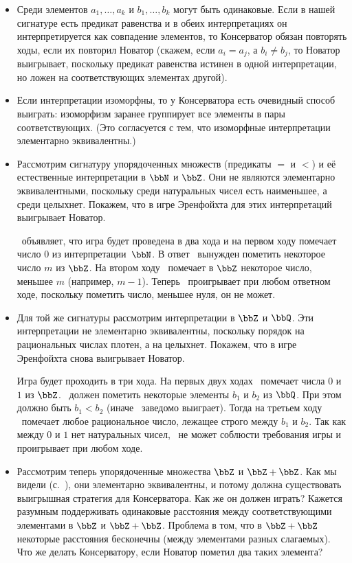 \begin{itemize}
        \item
Среди элементов $a_1,\dots,a_k$ и $b_1,\dots,b_k$ могут быть
одинаковые. Если в нашей сигнатуре есть предикат равенства и в
обеих интерпретациях он интерпретируется как совпадение
элементов, то Консерватор обязан повторять ходы, если их
повторил Новатор (скажем, если $a_i=a_j$, а $b_i\ne b_j$, то
Новатор выигрывает, поскольку предикат равенства истинен в одной
интерпретации, но ложен на соответствующих элементах другой).
        \item
Если интерпретации изоморфны, то у Консерватора есть очевидный
способ выиграть: изоморфизм заранее группирует все элементы в
пары соответствующих. (Это согласуется с тем, что изоморфные
интерпретации элементарно эквивалентны.)
        \item
Рассмотрим сигнатуру упорядоченных множеств (предикаты $=$ и
$<$) и её естественные интерпретации в $\bbN$ и $\bbZ$. Они не
являются элементарно эквивалентными, поскольку среди натуральных
чисел есть наименьшее, а среди целых\т нет. Покажем, что в игре
Эренфойхта для этих интерпретаций выигрывает Новатор.

\Н\ объявляет, что игра будет проведена в два хода и на первом
ходу помечает число $0$ из интерпретации~$\bbN$. В ответ
\К\ вынужден
пометить некоторое число $m$ из $\bbZ$. На втором ходу \Н\
помечает в $\bbZ$ некоторое число, меньшее $m$ (например,
$m-1$). Теперь \К\ проигрывает при любом ответном ходе,
поскольку пометить число, меньшее нуля, он не может.
        \item
Для той же сигнатуры рассмотрим интерпретации в $\bbZ$ и $\bbQ$.
Эти интерпретации не элементарно эквивалентны, поскольку порядок
на рациональных числах плотен, а на целых\т нет. Покажем, что в
игре Эренфойхта снова выигрывает Новатор.

Игра будет проходить в три хода. На первых двух ходах \Н\
помечает числа $0$ и $1$ из $\bbZ$. \К\ должен пометить
некоторые элементы $b_1$ и $b_2$ из $\bbQ$. При этом должно быть
$b_1<b_2$ (иначе \Н\ заведомо выиграет). Тогда на третьем ходу \Н\
помечает любое рациональное число, лежащее строго между $b_1$ и
$b_2$. Так как между $0$ и $1$ нет натуральных чисел, \К\ не
может соблюсти требования игры и проигрывает при любом ходе.
        \item
\label{z-equivalent-z-plus-z-2}%
Рассмотрим теперь упорядоченные множества $\bbZ$ и $\bbZ+\bbZ$.
Как мы видели (с.~\pageref{z-equivalent-z-plus-z}),
они элементарно эквивалентны, и потому должна существовать
выигрышная стратегия для Консерватора. Как же он должен играть?
Кажется разумным поддерживать одинаковые расстояния между
соответствующими элементами в $\bbZ$ и $\bbZ+\bbZ$. Проблема в
том, что в $\bbZ+\bbZ$ некоторые
расстояния бесконечны (между элементами
разных слагаемых). Что же делать Консерватору, если
Новатор пометил два таких элемента?


\end{itemize}
